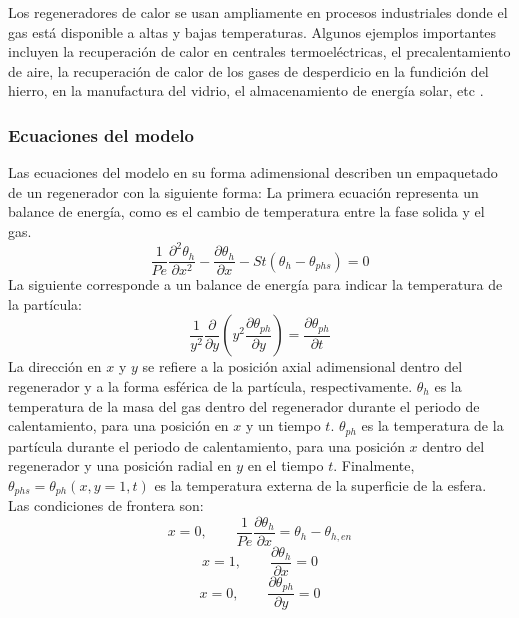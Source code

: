 \documentclass[12pt,letterpaper,final]{article}%
\begin{document}
Los regeneradores de calor se usan ampliamente en procesos industriales donde el gas está disponible a altas y bajas temperaturas. Algunos ejemplos importantes incluyen la recuperación de calor en centrales termoeléctricas, el precalentamiento de aire, la recuperación de calor de los gases de desperdicio en la fundición del hierro, en la manufactura del vidrio, el almacenamiento de energía solar, etc \cite{Ramachadran1984}.
\newline
\subsubsection*{Ecuaciones del modelo}
Las ecuaciones del modelo en su forma adimensional describen un empaquetado de un regenerador con la siguiente forma:
\newline
La primera ecuación representa un balance de energía, como es el cambio de temperatura entre la fase solida y el gas.
\begin{equation}
	\frac{1}{Pe}\frac{\partial ^2 \theta_h}{\partial x^2} - \frac{\partial \theta_h}{\partial x} - St(\theta_h -\theta_{phs}) = 0
\end{equation}
La siguiente corresponde a un balance de energía para indicar la temperatura de la partícula:
\begin{equation}
	\frac{1}{y^2}\frac{\partial}{\partial y}(y^2\frac{\partial \theta_{ph}}{\partial y}) = \frac{\partial \theta_{ph}}{\partial t} 
\end{equation}
La dirección en $x$ y $y$ se refiere a la posición axial adimensional dentro del regenerador y a la forma esférica de la partícula, respectivamente. $\theta_h$ es la temperatura de la masa del gas dentro del regenerador durante el periodo de calentamiento, para una posición en $x$ y un tiempo $t$. $\theta_{ph}$ es la temperatura de la partícula durante el periodo de calentamiento, para una posición $x$ dentro del regenerador y una posición radial en $y$ en el tiempo $t$. Finalmente, $\theta_{phs}=\theta_{ph}(x,y=1,t)$ es la temperatura externa de la superficie de la esfera.
\newline
Las condiciones de frontera son:
\begin{equation}
	x = 0, \qquad \frac{1}{Pe}\frac{\partial \theta_h}{\partial x} = \theta_h - \theta_{h,en}
\end{equation} 
\begin{equation}
	x = 1, \qquad \frac{\partial \theta_h}{\partial x} = 0
\end{equation}
\begin{equation}
	x = 0, \qquad \frac{\partial \theta_{ph}}{\partial y} = 0
\end{equation} 
\end{document}

